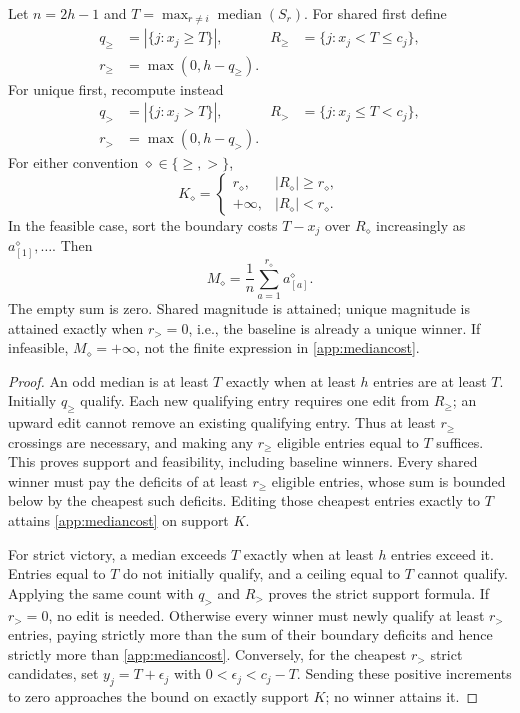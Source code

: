 \begin{appprop}
\label{app:prop:median}
Let $n=2h-1$ and $T=\max_{r\ne i}\operatorname{median}(S_r)$. For shared first define
\begin{align*}
 q_{\geq}&=|\{j:x_j\geq T\}|,&
 R_{\geq}&=\{j:x_j<T\leq c_j\},\\
 r_{\geq}&=\max(0,h-q_{\geq}).
\end{align*}
For unique first, recompute instead
\begin{align*}
 q_{>}&=|\{j:x_j>T\}|,&
 R_{>}&=\{j:x_j\leq T<c_j\},\\
 r_{>}&=\max(0,h-q_{>}).
\end{align*}
For either convention $\diamond\in\{\geq,>\}$,
\[
 K_\diamond=\begin{cases}
 r_\diamond,&|R_\diamond|\geq r_\diamond,\\
 +\infty,&|R_\diamond|<r_\diamond.
 \end{cases}
\]
In the feasible case, sort the boundary costs $T-x_j$ over $R_\diamond$ increasingly as $a^\diamond_{[1]},\ldots$. Then
\begin{equation}
 M_\diamond=\frac1n\sum_{a=1}^{r_\diamond}a^\diamond_{[a]}.
 \label{app:mediancost}
\end{equation}
The empty sum is zero. Shared magnitude is attained; unique magnitude is attained exactly when $r_{>}=0$, i.e., the baseline is already a unique winner. If infeasible, $M_\diamond=+\infty$, not the finite expression in \eqref{app:mediancost}.
\end{appprop}
\begin{proof}
An odd median is at least $T$ exactly when at least $h$ entries are at least $T$. Initially $q_{\geq}$ qualify. Each new qualifying entry requires one edit from $R_{\geq}$; an upward edit cannot remove an existing qualifying entry. Thus at least $r_{\geq}$ crossings are necessary, and making any $r_{\geq}$ eligible entries equal to $T$ suffices. This proves support and feasibility, including baseline winners. Every shared winner must pay the deficits of at least $r_{\geq}$ eligible entries, whose sum is bounded below by the cheapest such deficits. Editing those cheapest entries exactly to $T$ attains \eqref{app:mediancost} on support $K$.

For strict victory, a median exceeds $T$ exactly when at least $h$ entries exceed it. Entries equal to $T$ do not initially qualify, and a ceiling equal to $T$ cannot qualify. Applying the same count with $q_>$ and $R_>$ proves the strict support formula. If $r_{>}=0$, no edit is needed. Otherwise every winner must newly qualify at least $r_>$ entries, paying strictly more than the sum of their boundary deficits and hence strictly more than \eqref{app:mediancost}. Conversely, for the cheapest $r_>$ strict candidates, set $y_j=T+\epsilon_j$ with $0<\epsilon_j<c_j-T$. Sending these positive increments to zero approaches the bound on exactly support $K$; no winner attains it.
\end{proof}

